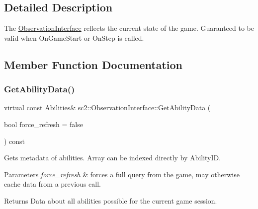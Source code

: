 \subsection{Detailed Description}
The \hyperlink{classsc2_1_1_observation_interface}{Observation\+Interface} reflects the current state of the game. Guaranteed to be valid when On\+Game\+Start or On\+Step is called. 

\subsection{Member Function Documentation}
\mbox{\label{classsc2_1_1_observation_interface_a99e1d892c350e4ae10c615bf3185eb85}} 
\subsubsection{\texorpdfstring{Get\+Ability\+Data()}{GetAbilityData()}}
{\footnotesize\ttfamily virtual const Abilities\& sc2\+::\+Observation\+Interface\+::\+Get\+Ability\+Data (\begin{DoxyParamCaption}\item[{bool}]{force\+\_\+refresh = {\ttfamily false} }\end{DoxyParamCaption}) const\hspace{0.3cm}{\ttfamily [pure virtual]}}

Gets metadata of abilities. Array can be indexed directly by Ability\+ID. 
\begin{DoxyParams}{Parameters}
{\em force\+\_\+refresh} & forces a full query from the game, may otherwise cache data from a previous call. \\
\hline
\end{DoxyParams}
\begin{DoxyReturn}{Returns}
Data about all abilities possible for the current game session. 
\end{DoxyReturn}
\mbox{\label{classsc2_1_1_observation_interface_a1ab99209855a20aae751684e1af19aaa}} 
